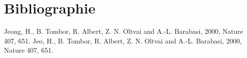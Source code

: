 %
\chapter*{Bibliographie}

 \begin{thebibliography}{99}
 

 Jeong,  H., B. Tombor, R. Albert, Z. N. Oltvai and A.-L. Barabasi, 2000, Nature 407, 651.
 Jeo,  H., B. Tombor, R. Albert, Z. N. Oltvai and A.-L. Barabasi, 2000, Nature 407, 651.
\end{thebibliography}